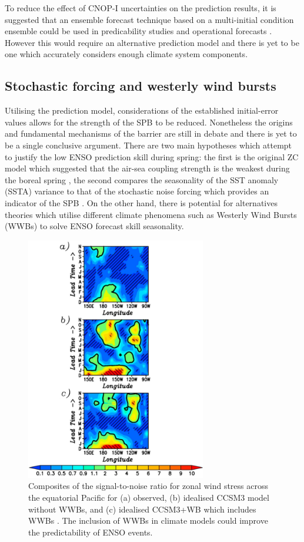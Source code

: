 \documentclass[12pt, onecolumn]{revtex4}    %
\begin{document}
To reduce the effect of CNOP-I uncertainties on the prediction results, it is suggested that an ensemble forecast technique based on a multi-initial condition ensemble could be used in predicability studies and operational forecasts \citep{kirtman2001current}. However this would require an alternative prediction model and there is yet to be one which accurately considers enough climate system components. 

\subsection{Stochastic forcing and westerly wind bursts}
\noindent
Utilising the prediction model, considerations of the established initial-error values allows for the strength of the SPB to be reduced. Nonetheless the origins and fundamental mechanisms of the barrier are still in debate and there is yet to be a single conclusive argument. There are two main hypotheses which attempt to justify the low ENSO prediction skill during spring: the first is the original ZC model which suggested that the air-sea coupling strength is the weakest during the boreal spring \citep{Zebiak:1987aa}, the second compares the seasonality of the SST anomaly (SSTA) variance to that of the stochastic noise forcing which provides an indicator of the SPB \citep{webster1992monsoon, xue1994prediction}. On the other hand, there is potential for alternatives theories which utilise different climate phenomena such as Westerly Wind Bursts (WWBs) to solve ENSO forecast skill seasonality. \\

\begin{figure}
\includegraphics[width=0.7\textwidth]{data/wwbs}
\caption[WWBs]{Composites of the signal-to-noise ratio for zonal wind stress across the equatorial Pacific for (a) observed, (b) idealised CCSM3 model without WWBs, and (c) idealised CCSM3+WB which includes WWBs \citep{lopez2014wwbs}. The inclusion of WWBs in climate models could improve the predictability of ENSO events.}
\label{fig:wwbs}
\end{figure}
\end{document}
